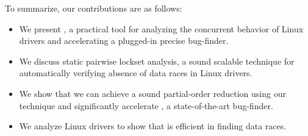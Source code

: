 To summarize, our contributions are as follows:
\begin{itemize}
\item We present \whoop, a practical tool for analyzing the concurrent behavior of Linux drivers and accelerating a plugged-in precise bug-finder.
\item We discuss static pairwise lockset analysis,  a sound scalable technique for automatically verifying absence of data races in Linux drivers.
\item We show that we can achieve a sound partial-order reduction using our technique and significantly accelerate \corral, a state-of-the-art bug-finder.
\item We analyze \sizeOfBenchmarks Linux drivers to show that \whoop is efficient in finding data races.
\end{itemize}
